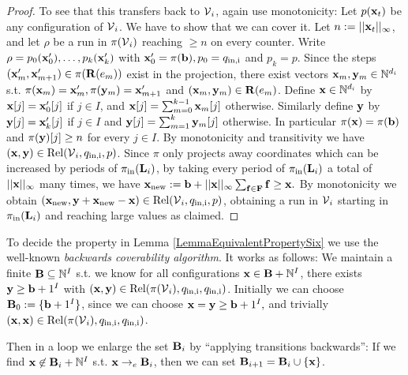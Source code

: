 \begin{proof}
To see that this transfers back to \(\operatorname{\mathcal{V}}_i\), again use monotonicity: Let \(p(\mathbf{x}_t)\) be any configuration of \(\operatorname{\mathcal{V}}_i\). We have to show that we can cover it. Let \(n:=||\mathbf{x}_t||_{\infty}\), and let \(\rho\) be a run in \(\pi(\operatorname{\mathcal{V}}_i)\) reaching \(\geq n\) on every counter. Write \(\rho=p_0(\mathbf{x}_0'), \dots, p_k(\mathbf{x}_k')\) with \(\mathbf{x}_0'=\pi(\mathbf{b}), p_0=q_{\text{in,i}}\) and \(p_k=p\). Since the steps \((\mathbf{x}_m', \mathbf{x}_{m+1}')\in \pi(\mathbf{R}(e_m))\) exist in the projection, there exist vectors \(\mathbf{x}_m, \mathbf{y}_m \in \mathbb{N}^{d_i}\) s.t. \(\pi(\mathbf{x}_m)=\mathbf{x}_m', \pi(\mathbf{y}_m)=\mathbf{x}_{m+1}'\) and \((\mathbf{x}_m, \mathbf{y}_m) \in \mathbf{R}(e_m)\). Define \(\mathbf{x} \in \mathbb{N}^{d_i}\) by \(\mathbf{x}[j]=\mathbf{x}_0'[j]\) if \(j \in I\), and \(\mathbf{x}[j]=\sum_{m=0}^{k-1} \mathbf{x}_m[j]\) otherwise. Similarly define \(\mathbf{y}\) by \(\mathbf{y}[j]=\mathbf{x}_k'[j]\) if \(j \in I\) and \(\mathbf{y}[j]=\sum_{m=1}^{k} \mathbf{y}_m[j]\) otherwise. In particular \(\pi(\mathbf{x})=\pi(\mathbf{b})\) and \(\pi(\mathbf{y})[j] \geq n\) for every \(j \in I\). By monotonicity and transitivity we have \((\mathbf{x}, \mathbf{y}) \in \operatorname{Rel}(\operatorname{\mathcal{V}}_i, q_{\text{in,i}}, p)\). Since \(\pi\) only projects away coordinates which can be increased by periods of \(\pi_{\text{in}}(\mathbf{L}_i)\), by taking every period of \(\pi_{\text{in}}(\mathbf{L}_i)\) a total of \(||\mathbf{x}||_{\infty}\) many times, we have \(\mathbf{x}_{\text{new}}:=\mathbf{b}+||\mathbf{x}||_{\infty} \sum_{\mathbf{f} \in \mathbf{F}} \mathbf{f}\geq \mathbf{x}.\) By monotonicity we obtain \((\mathbf{x}_{\text{new}}, \mathbf{y}+\mathbf{x}_{\text{new}}-\mathbf{x}) \in \operatorname{Rel}(\operatorname{\mathcal{V}}_i, q_{\text{in,i}}, p)\), obtaining a run in \(\operatorname{\mathcal{V}}_i\) starting in \(\pi_{\text{in}}(\mathbf{L}_i)\) and reaching large values as claimed.
\end{proof}

To decide the property in Lemma \ref{LemmaEquivalentPropertySix} we use the well-known \emph{backwards coverability algorithm}. It works as follows: We maintain a finite \(\mathbf{B} \subseteq \mathbb{N}^I\) s.t. we know for all configurations \(\mathbf{x} \in \mathbf{B}+\mathbb{N}^I\), there exists \(\mathbf{y} \geq \mathbf{b}+1^I\) with \((\mathbf{x}, \mathbf{y}) \in \operatorname{Rel}(\pi(\operatorname{\mathcal{V}}_i), q_{\text{in,i}}, q_{\text{in,i}})\). Initially we can choose \(\mathbf{B}_0:=\{\mathbf{b}+1^I\}\), since we can choose \(\mathbf{x}=\mathbf{y} \geq \mathbf{b}+1^I,\) and trivially \((\mathbf{x}, \mathbf{x}) \in \operatorname{Rel}(\pi(\operatorname{\mathcal{V}}_i), q_{\text{in,i}}, q_{\text{in,i}})\). 

Then in a loop we enlarge the set \(\mathbf{B}_i\) by ``applying transitions backwards'': If we find \(\mathbf{x} \not \in \mathbf{B}_i+\mathbb{N}^I\) s.t. \(\mathbf{x} \to_e \mathbf{B}_i\), then we can set \(\mathbf{B}_{i+1}=\mathbf{B}_i \cup \{\mathbf{x}\}\). 

